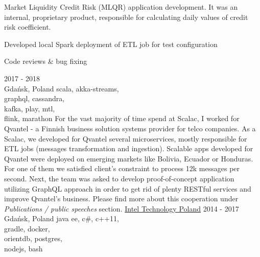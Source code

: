 \documentclass[a4paper,11pt]{cv4tw}%
\begin{document}
      {Market Liquidity Credit Risk (MLQR) application development. It was an internal,
        proprietary product, responsible for calculating daily values of credit risk
        coefficient.
        \begin{missions}
        \item Developed local Spark deployment of ETL job for test configuration
        \item Code reviews \& bug fixing
        \end{missions}
      }
      {2017 - 2018\\Gdańsk, Poland}
      {scala, akka-streams,\\graphql, cassandra,\\kafka, play, mtl,\\flink, marathon}
      {For the vast majority of time spend at Scalac, I worked for Qvantel - a Finnish business solution systems provider for telco companies.
        As a Scalac, we developed for Qvantel several microservices, mostly responsible for ETL jobs (messages transformation and ingestion).
        Scalable apps developed for Qvantel were deployed on emerging markets like Bolivia, Ecuador or Honduras. For one of them we satisfied client's constraint
        to process \approx12k messages per second. Next, the team was asked to develop proof-of-concept application utilizing GraphQL approach in order to get
        rid of plenty RESTful services and improve Qvantel's business. Please find more about this cooperation under \emph{Publications / public speeches} section.
      }
      {\href{https://www.intel.com/content/www/us/en/jobs/locations/poland.html}
        {Intel Technology Poland}}
      {2014 - 2017\\Gdańsk, Poland}
      {java ee, c\#, c++11,\\gradle, docker,\\orientdb, postgres,\\nodejs, bash}
\end{document}
